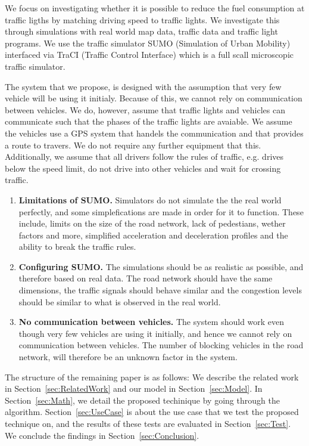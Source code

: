 We focus on investigating whether it is possible to reduce the fuel consumption at traffic ligths by matching driving speed to traffic lights. 
We investigate this through simulations with real world map data, traffic data and traffic light programs. %
We use the traffic simulator SUMO (Simulation of Urban Mobility)\cite{sumo} interfaced via TraCI (Traffic Control Interface)\cite{traci} which is a full scall microscopic traffic simulator.

The system that we propose, is designed with the assumption that very few vehicle will be using it initialy. 
Because of this, we cannot rely on communication between vehicles.
We do, however, assume that traffic lights and vehicles can communicate such that the phases of the traffic lights are avaiable.
We assume the vehicles use a GPS system that handels the communication and that provides a route to travers.
We do not require any further equipment that this.
Additionally, we assume that all drivers follow the rules of traffic, e.g. drives below the speed limit, do not drive into other vehicles and wait for crossing traffic.

\begin{enumerate} %
\item \textbf{Limitations of SUMO.}
Simulators do not simulate the the real world perfectly, and some simplefications are made in order for it to function. 
These include, limits on the size of the road network, lack of pedestians, wether factors and more, simplified acceleration and deceleration profiles and the ability to break the traffic rules.
\item \textbf{Configuring SUMO.}
The simulations should be as realistic as possible, and therefore based on real data. 
The road network should have the same dimensions, the traffic signals should behave similar and the congestion levels should be similar to what is observed in the real world.
\item \textbf{No communication between vehicles.} 
The system should work even though very few vehicles are using it initially, and hence we cannot rely on communication between vehicles. 
The number of blocking vehicles in the road network, will therefore be an unknown factor in the system.
\end{enumerate}


The structure of the remaining paper is as follows: 
We describe the related work in Section~\ref{sec:RelatedWork} and our model in Section~\ref{sec:Model}. 
In Section~\ref{sec:Math}, we detail the proposed techinique by going through the algorithm.
Section~\ref{sec:UseCase} is about the use case that we test the proposed technique on, and the results of these tests are evaluated in Section~\ref{sec:Test}. 
We conclude the findings in Section~\ref{sec:Conclusion}.





